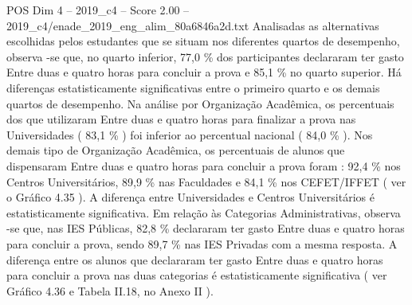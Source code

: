 \begin{textsample}{POS Dim 4 – 2019\_c4 – Score 2.00 – 2019\_c4/enade\_2019\_eng\_alim\_80a6846a2d.txt}
Analisadas as alternativas escolhidas pelos estudantes que se situam nos diferentes quartos de desempenho, observa -se que, no quarto inferior, 77,0 \% dos participantes declararam ter gasto Entre duas e quatro horas para concluir a prova e 85,1 \% no quarto superior.
Há diferenças estatisticamente significativas entre o primeiro quarto e os demais quartos de desempenho.
Na análise por Organização Acadêmica, os percentuais dos que utilizaram Entre duas e quatro horas para finalizar a prova nas Universidades ( 83,1 \% ) foi inferior ao percentual nacional ( 84,0 \% ).
Nos demais tipo de Organização Acadêmica, os percentuais de alunos que dispensaram Entre duas e quatro horas para concluir a prova foram : 92,4 \% nos Centros Universitários, 89,9 \% nas Faculdades e 84,1 \% nos CEFET/IFFET ( ver o Gráfico 4.35 ).
A diferença entre Universidades e Centros Universitários é estatisticamente significativa.
Em relação às Categorias Administrativas, observa -se que, nas IES Públicas, 82,8 \% declararam ter gasto Entre duas e quatro horas para concluir a prova, sendo 89,7 \% nas IES Privadas com a mesma resposta.
A diferença entre os alunos que declararam ter gasto Entre duas e quatro horas para concluir a prova nas duas categorias é estatisticamente significativa ( ver Gráfico 4.36 e Tabela II.18, no Anexo II ).

\end{textsample}
